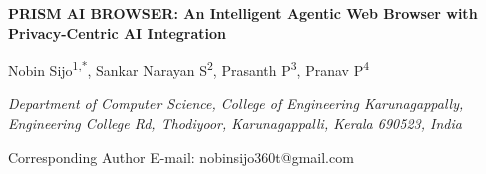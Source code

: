 \documentclass[12pt,a4paper]{article}
\begin{document}
\begin{center}
{\fontsize{14}{16}\selectfont\textbf{PRISM AI BROWSER: An Intelligent Agentic Web Browser with Privacy-Centric AI Integration}}
\end{center}

\vspace{0.3cm}

\begin{center}
{\fontsize{12}{14}\selectfont Nobin Sijo\textsuperscript{1,*}, Sankar Narayan S\textsuperscript{2}, Prasanth P\textsuperscript{3}, Pranav P\textsuperscript{4}}
\end{center}

\vspace{0.2cm}

\begin{center}
{\fontsize{11}{13}\selectfont\textit{Department of Computer Science, College of Engineering Karunagappally, Engineering College Rd, Thodiyoor, Karunagappalli, Kerala 690523, India}}
\end{center}

\vspace{0.2cm}

\begin{center}
{\fontsize{10}{12}\selectfont *Corresponding Author E-mail: nobinsijo360t@gmail.com}
\end{center}

\vspace{0.4cm}


\vspace{0.2cm}
\end{document}
